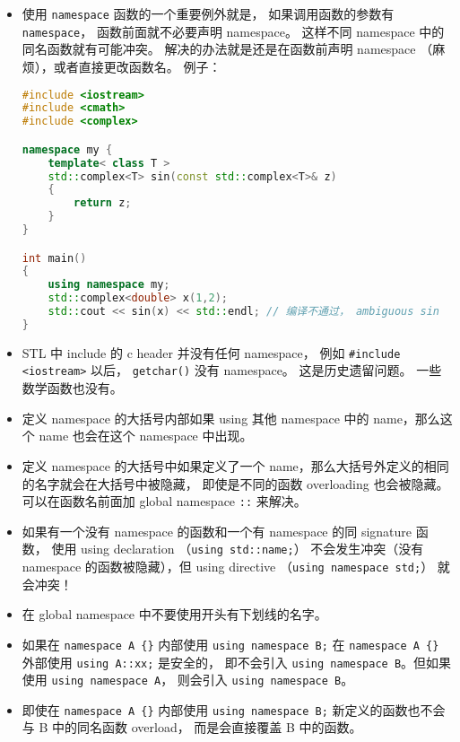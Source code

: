 
\begin{issues}
\issueDraft
\end{issues}

\begin{itemize}
\item 使用 \verb|namespace| 函数的一个重要例外就是， 如果调用函数的参数有 \verb|namespace|， 函数前面就不必要声明 namespace。 这样不同 namespace 中的同名函数就有可能冲突。 解决的办法就是还是在函数前声明 namespace （麻烦），或者直接更改函数名。 例子：
\begin{lstlisting}[language=cpp]
#include <iostream>
#include <cmath>
#include <complex>

namespace my {
	template< class T >
	std::complex<T> sin(const std::complex<T>& z)
	{
		return z;
	}
}

int main()
{
	using namespace my;
	std::complex<double> x(1,2);
	std::cout << sin(x) << std::endl; // 编译不通过， ambiguous sin
}
\end{lstlisting}
\item STL 中 include 的 c header 并没有任何 namespace， 例如 \verb|#include <iostream>| 以后， \verb|getchar()| 没有 namespace。 这是历史遗留问题。 一些数学函数也没有。
\item 定义 namespace 的大括号内部如果 using 其他 namespace 中的 name，那么这个 name 也会在这个 namespace 中出现。
\item 定义 namespace 的大括号中如果定义了一个 name，那么大括号外定义的相同的名字就会在大括号中被隐藏， 即使是不同的函数 overloading 也会被隐藏。 可以在函数名前面加 global namespace \verb|::| 来解决。
\item 如果有一个没有 namespace 的函数和一个有 namespace 的同 signature 函数， 使用 using declaration （\verb|using std::name;|） 不会发生冲突（没有 namespace 的函数被隐藏），但 using directive （\verb|using namespace std;|） 就会冲突！
\item 在 global namespace 中不要使用开头有下划线的名字。
\item 如果在 \verb|namespace A {}| 内部使用 \verb|using namespace B;| 在 \verb|namespace A {}| 外部使用 \verb|using A::xx;| 是安全的， 即不会引入 \verb|using namespace B|。但如果使用 \verb|using namespace A|， 则会引入 \verb|using namespace B|。
\item 即使在 \verb|namespace A {}| 内部使用 \verb|using namespace B;|  新定义的函数也不会与 B 中的同名函数 overload， 而是会直接覆盖 B 中的函数。
\end{itemize}
